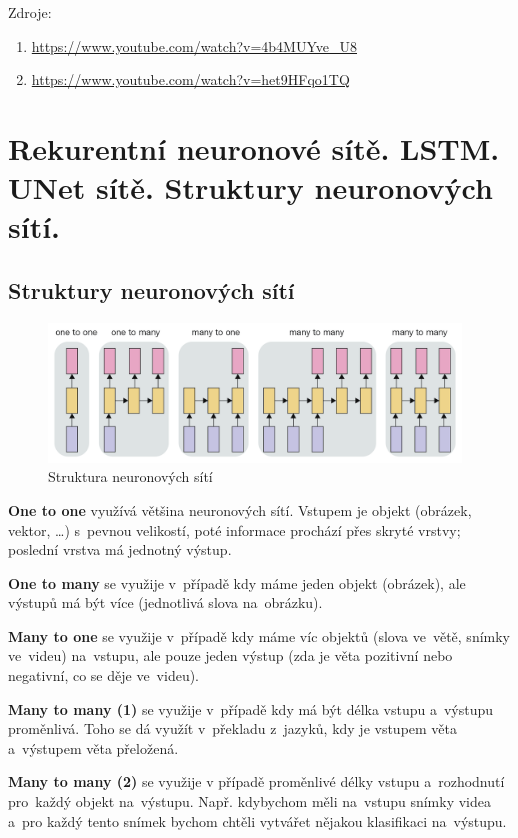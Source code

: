 Zdroje:
\begin{enumerate}
    \item \url{https://www.youtube.com/watch?v=4b4MUYve_U8}
    \item \url{https://www.youtube.com/watch?v=het9HFqo1TQ}
\end{enumerate}

\clearpage
\section{Rekurentní neuronové sítě. LSTM. UNet sítě. Struktury neuronových sítí.}

\subsection{Struktury neuronových sítí}

\begin{figure}[h]
    \centering
	\includegraphics[height=10em]{images/09_NN-struktura.png}
    \caption{Struktura neuronových sítí}
    \label{NNS}
\end{figure}

\textbf{One to one} využívá většina neuronových sítí. 
Vstupem je objekt (obrázek, vektor, \dots) s~pevnou velikostí, poté informace prochází přes skryté vrstvy; poslední vrstva má jednotný výstup.

\textbf{One to many} se využije v~případě kdy máme jeden objekt (obrázek), ale výstupů má být více (jednotlivá slova na~obrázku).

\textbf{Many to one} se využije v~případě kdy máme víc objektů (slova ve~větě, snímky ve~videu) na~vstupu, ale pouze jeden výstup (zda je věta pozitivní nebo negativní, co se děje ve~videu).

\textbf{Many to many (1)} se využije v~případě kdy má být délka vstupu a~výstupu proměnlivá.
Toho se dá využít v~překladu z~jazyků, kdy je vstupem věta a~výstupem věta přeložená.

\textbf{Many to many (2)} se využije v případě proměnlivé délky vstupu a~rozhodnutí pro~každý objekt na~výstupu.
Např. kdybychom měli na~vstupu snímky videa a~pro každý tento snímek bychom chtěli vytvářet nějakou klasifikaci na~výstupu.

